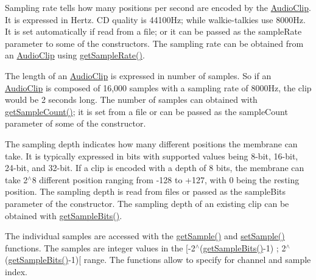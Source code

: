 Sampling rate tells how many positions per second are encoded by the \hyperlink{classbridges_1_1datastructure_1_1_audio_clip}{Audio\+Clip}. It is expressed in Hertz. CD quality is 44100\+Hz; while walkie-\/talkies use 8000\+Hz. It is set automatically if read from a file; or it can be passed as the sample\+Rate parameter to some of the constructors. The sampling rate can be obtained from an \hyperlink{classbridges_1_1datastructure_1_1_audio_clip}{Audio\+Clip} using \hyperlink{classbridges_1_1datastructure_1_1_audio_clip_a520e4a9bbe0685b3598d90668172618c}{get\+Sample\+Rate()}.

The length of an \hyperlink{classbridges_1_1datastructure_1_1_audio_clip}{Audio\+Clip} is expressed in number of samples. So if an \hyperlink{classbridges_1_1datastructure_1_1_audio_clip}{Audio\+Clip} is composed of 16,000 samples with a sampling rate of 8000\+Hz, the clip would be 2 seconds long. The number of samples can obtained with \hyperlink{classbridges_1_1datastructure_1_1_audio_clip_aaaee4b34cd512c02a0c0ea072782a9d6}{get\+Sample\+Count()}; it is set from a file or can be passed as the sample\+Count parameter of some of the constructor.

The sampling depth indicates how many different positions the membrane can take. It is typically expressed in bits with supported values being 8-\/bit, 16-\/bit, 24-\/bit, and 32-\/bit. If a clip is encoded with a depth of 8 bits, the membrane can take 2$^\wedge$8 different position ranging from -\/128 to +127, with 0 being the resting position. The sampling depth is read from files or passed as the sample\+Bits parameter of the constructor. The sampling depth of an existing clip can be obtained with \hyperlink{classbridges_1_1datastructure_1_1_audio_clip_aca7c5460d005d62a7a0d2eae595e63d3}{get\+Sample\+Bits()}.

The individual samples are accessed with the \hyperlink{classbridges_1_1datastructure_1_1_audio_clip_a24bd273de32369cb9d979e7250759717}{get\+Sample()} and \hyperlink{classbridges_1_1datastructure_1_1_audio_clip_aa7617402fd316152dd2585a5dbe33ded}{set\+Sample()} functions. The samples are integer values in the \mbox{[}-\/2$^\wedge$(\hyperlink{classbridges_1_1datastructure_1_1_audio_clip_aca7c5460d005d62a7a0d2eae595e63d3}{get\+Sample\+Bits()}-\/1) ; 2$^\wedge$(\hyperlink{classbridges_1_1datastructure_1_1_audio_clip_aca7c5460d005d62a7a0d2eae595e63d3}{get\+Sample\+Bits()}-\/1)\mbox{[} range. The functions allow to specify for channel and sample index.

